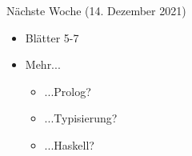 \documentclass{beamer}
\begin{document}

\begin{frame}{Nächste Woche (14. Dezember 2021)}
    \begin{itemize}
        \item Blätter 5-7
        \item Mehr...
        \begin{itemize}
            \item ...Prolog?
            \item ...Typisierung?
            \item ...Haskell?
        \end{itemize}
    \end{itemize}
\end{frame}
\end{document}
